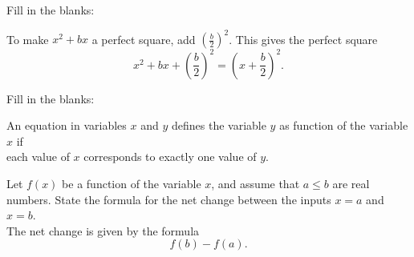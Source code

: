 \documentclass[12pt]{amsart}
\begin{document}
\begin{thm}[3 Points]\label{ex4}
  Fill in the blanks:\\
  \begin{center}
    To make $x^2 + bx$ a perfect square, add $\left(\frac{b}{2}\right)^2$.
    This gives the perfect square
    \vspace{.5in}
    $$x^2 + bx + \left(\frac{b}{2}\right)^2 = \left(x + \frac{b}{2}\right)^2.$$
  \end{center}
\end{thm}
\vspace{.5in}
\begin{thm}[3 Points]\label{ex5}
  Fill in the blanks:\\
  \begin{center}
    An equation in variables $x$ and $y$ defines the variable $y$ as function of the variable $x$ if\\
    \vspace{.2in}
    each value of $x$ corresponds to exactly one value of $y$.
  \end{center}
\end{thm}
\vspace{.5in}
\begin{thm}[3 Points]\label{ex6}
  Let $f(x)$ be a function of the variable $x$, and assume that $a \leq b$ are real numbers.
  State the formula for the net change between the inputs $x = a$ and $x = b$.\\
  
  \vspace{.5in}
  The net change is given by the formula
  $$f(b) - f(a).$$
\end{thm}

\newpage
\end{document}
